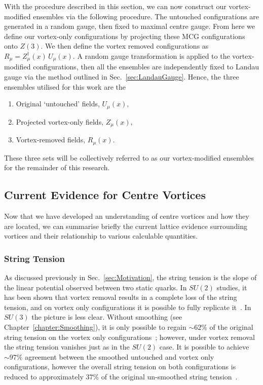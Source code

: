 With the procedure described in this section, we can now construct our vortex-modified ensembles via the following procedure. The untouched configurations are generated in a random gauge, then fixed to maximal centre gauge. From here we define our vortex-only configurations by projecting these MCG configurations onto $Z(3)$. We then define the vortex removed configurations as $R_\mu = Z^{\dagger}_{\mu}(x)\,U_{\mu}(x)$. A random gauge transformation is applied to the vortex-modified configurations, then all the ensembles are independently fixed to Landau gauge via the method outlined in Sec.~\ref{sec:LandauGauge}. Hence, the three ensembles utilised for this work are the
\begin{enumerate}
\item Original `untouched' fields, $U_{\mu}(x),$

\item Projected vortex-only fields, $Z_{\mu}(x),$

\item Vortex-removed fields, $R_\mu(x).$
\end{enumerate}
These three sets will be collectively referred to as our vortex-modified ensembles for the remainder of this research.\\

\subsection{Current Evidence for Centre Vortices}\label{sec:CurrentEvidence}
Now that we have developed an understanding of centre vortices and how they are located, we can summarise briefly the current lattice evidence surrounding vortices and their relationship to various calculable quantities.
 
\subsubsection{String Tension}
As discussed previously in Sec.~\ref{sec:Motivation}, the string tension is the slope of the linear potential observed between two static quarks. In $SU(2)$ studies, it has been shown that vortex removal results in a complete loss of the string tension, and on vortex only configurations it is possible to fully replicate it~\cite{Cais:2008za}. In $SU(3)$ the picture is less clear. Without smoothing (see Chapter~\ref{chapter:Smoothing}), it is only possible to regain $\sim 62\%$ of the original string tension on the vortex only configurations~\cite{Langfeld:2003ev}; however, under vortex removal the string tension vanishes just as in the $SU(2)$ case. It is possible to achieve $\sim 97\%$ agreement between the smoothed untouched and vortex only configurations, however the overall string tension on both configurations is reduced to approximately $37\%$ of the original un-smoothed string tension~\cite{Trewartha:2015ida}.  

